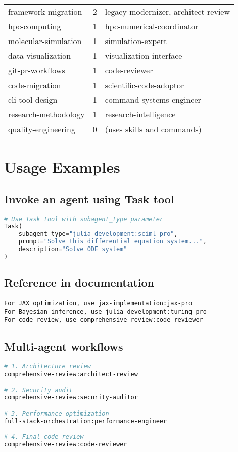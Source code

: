 \documentclass[11pt,a4paper]{article}
\begin{document}
\begin{longtable}{>{\ttfamily}p{} c >{\raggedright\arraybackslash}p{}}
framework-migration & 2 & legacy-modernizer, architect-review \\
hpc-computing & 1 & hpc-numerical-coordinator \\
molecular-simulation & 1 & simulation-expert \\
data-visualization & 1 & visualization-interface \\
git-pr-workflows & 1 & code-reviewer \\
code-migration & 1 & scientific-code-adoptor \\
cli-tool-design & 1 & command-systems-engineer \\
research-methodology & 1 & research-intelligence \\
quality-engineering & 0 & (uses skills and commands) \\
\end{longtable}

\section{Usage Examples}

\subsection{Invoke an agent using Task tool}

\begin{lstlisting}[language=Python]
# Use Task tool with subagent_type parameter
Task(
    subagent_type="julia-development:sciml-pro",
    prompt="Solve this differential equation system...",
    description="Solve ODE system"
)
\end{lstlisting}

\subsection{Reference in documentation}

\begin{lstlisting}
For JAX optimization, use jax-implementation:jax-pro
For Bayesian inference, use julia-development:turing-pro
For code review, use comprehensive-review:code-reviewer
\end{lstlisting}

\subsection{Multi-agent workflows}

\begin{lstlisting}[language=bash]
# 1. Architecture review
comprehensive-review:architect-review

# 2. Security audit
comprehensive-review:security-auditor

# 3. Performance optimization
full-stack-orchestration:performance-engineer

# 4. Final code review
comprehensive-review:code-reviewer
\end{lstlisting}
\end{document}

